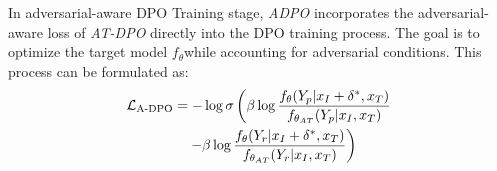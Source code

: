 In adversarial-aware DPO Training stage, \textit{ADPO} incorporates the adversarial-aware loss of \textit{AT-DPO} directly into the DPO training process. The goal is to optimize the target model $f_{\theta}$while accounting for adversarial conditions. This process can be formulated as:
\vspace{-0.5em}
{\fontsize{10}{12}
\begin{align}
\mathcal{L}_{\text{A-}\text{DPO}} &= -\log \sigma \left( \beta \log \frac{f_{\theta}(Y_{p} | x_I+\delta^* , x_T)}{f_{\theta_{AT}}(Y_{p} | x_I, x_T)} \right. \notag \\
&\quad \left. - \beta \log \frac{f_{\theta}(Y_{r} | x_I+\delta^* , x_T)}{f_{\theta_{AT}}(Y_{r} | x_I, x_T)} \right)
\end{align}
}
\vspace{-1em}


